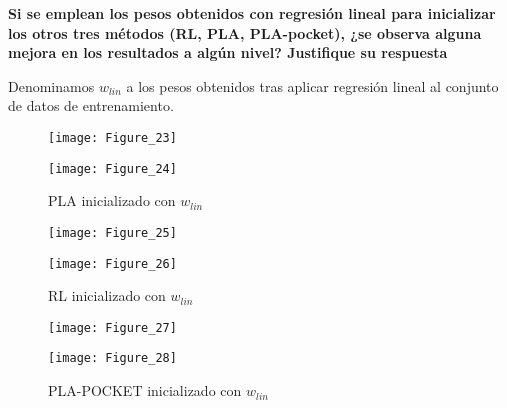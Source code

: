 \textbf{Si se emplean los pesos obtenidos con regresión lineal para inicializar
los otros tres métodos (RL, PLA, PLA-pocket), ¿se observa alguna mejora en
los resultados a algún nivel? Justifique su respuesta}

Denominamos $w_{lin}$ a los pesos obtenidos tras aplicar regresión lineal al conjunto
de datos de entrenamiento.

\begin{figure}[H]
    \caption{PLA inicializado con $w_{lin}$ \medskip}
    \begin{minipage}[b]{.5\linewidth}
      \centering
      \texttt{[image: Figure\_23]}
       \label{subfig-5:dummy66}
    \end{minipage}
    \hfill \hfill
    \begin{minipage}[b]{.5\linewidth}
      \centering
      \texttt{[image: Figure\_24]}
    \end{minipage}
    \label{fig:dummy66}
\end{figure}

\begin{figure}[H]
    \caption{RL inicializado con $w_{lin}$ \medskip}
    \begin{minipage}[b]{.5\linewidth}
      \centering
      \texttt{[image: Figure\_25]}
       \label{subfig-5:dummy67}
    \end{minipage}
    \hfill \hfill
    \begin{minipage}[b]{.5\linewidth}
      \centering
      \texttt{[image: Figure\_26]}
    \end{minipage}
    \label{fig:dummy67}
\end{figure}


\begin{figure}[H]
    \caption{PLA-POCKET inicializado con $w_{lin}$ \medskip}
    \begin{minipage}[b]{.5\linewidth}
      \centering
      \texttt{[image: Figure\_27]}
       \label{subfig-5:dummy68}
    \end{minipage}
    \hfill \hfill
    \begin{minipage}[b]{.5\linewidth}
      \centering
      \texttt{[image: Figure\_28]}
    \end{minipage}
    \label{fig:dummy68}
\end{figure}


